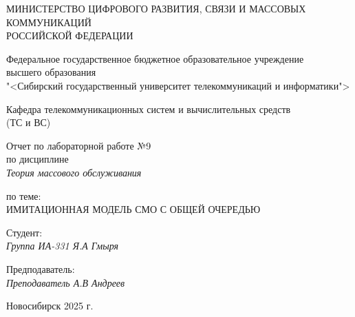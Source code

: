\thispagestyle{empty}

\begin{center}
    МИНИСТЕРСТВО ЦИФРОВОГО РАЗВИТИЯ, СВЯЗИ И МАССОВЫХ КОММУНИКАЦИЙ \\ РОССИЙСКОЙ ФЕДЕРАЦИИ

    \vspace{20pt}

    Федеральное государственное бюджетное образовательное учреждение  \\  высшего образования \\
    "<Сибирский государственный университет телекоммуникаций и информатики"> \\

    \vspace{20pt}

    Кафедра телекоммуникационных систем и вычислительных средств \\  (ТС и ВС)
\end{center}

\vfill

\begin{center}
    Отчет по лабораторной работе №9 \\  
    по дисциплине \\
    \textit{Теория массового обслуживания}

    \vspace{20pt} 
    по теме: \\
    \uppercase{Имитационная модель СМО с общей очередью}
\end{center}

\vfill

    \noindent Студент: \\
    \textit{Группа ИА-331 \hfill Я.А Гмыря}

    \vspace{20pt}

    \noindent Предподаватель: \\
    \textit{Преподаватель \hfill А.В Андреев}

\vfill

\begin{center}
    Новосибирск 2025 г.
\end{center}